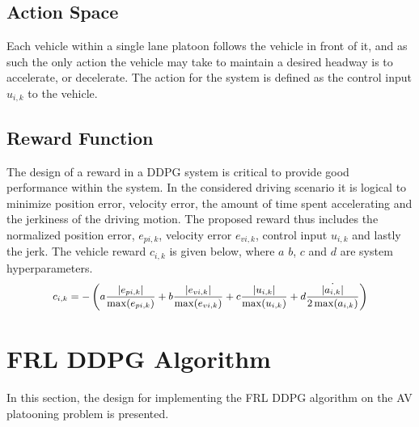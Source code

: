 \subsection{Action Space}
Each vehicle within a single lane platoon follows the vehicle in front of it, and as such the only action the vehicle may take to maintain a desired headway is to accelerate, or decelerate. The action for the system is defined as the control input $u_{i,k}$ to the vehicle.

\subsection{Reward Function}
The design of a reward in a DDPG system is critical to provide good performance within the system.  In the considered driving scenario it is logical to minimize position error, velocity error, the amount of time spent accelerating and the jerkiness of the driving motion.  The proposed reward thus includes the normalized position error, $e_{pi,k}$, velocity error $e_{vi,k}$, control input $u_{i,k}$ and lastly the jerk. The vehicle reward $c_{i,k}$ is given below, where $a$ $b$, $c$ and $d$ are system hyperparameters.
\begin{equation} \label{eqn:rewardB}
\small
\begin{aligned}
    c_{i,k} &= -\left(a\frac{|e_{pi,k}|}{\max(e_{pi,k})} + b\frac{|e_{vi,k}|}{\max(e_{vi,k})} + c\frac{|u_{i,k}|}{\max(u_{i,k})} +  d\frac{\dot{|a_{i,k}|}}{2\max(a_{i,k})}\right) \\
\end{aligned}
\end{equation}

\section{FRL DDPG Algorithm}
In this section, the design for implementing the FRL DDPG algorithm on the AV platooning problem is presented. 
